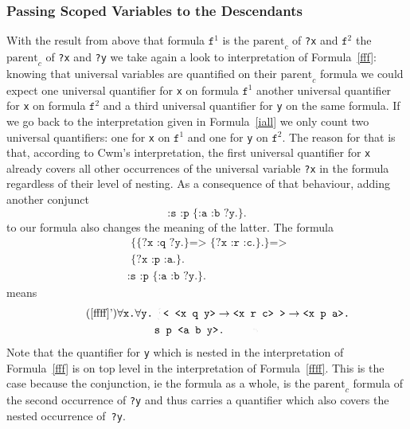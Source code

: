 \subsubsection*{Passing Scoped Variables to the Descendants}
With the result from above that formula $\texttt{f}^1$ is the $\text{parent}_c$ of \texttt{?x} and $\texttt{f}^2$ the $\text{parent}_c$ of \texttt{?x} and \texttt{?y} we take again a look to 
interpretation %
of Formula~\ref{fff}: 
knowing that universal variables are quantified on their $\text{parent}_c$ formula we could expect one universal quantifier for \texttt{x} on formula $\texttt{f}^1$ 
another universal quantifier for \texttt{x} on formula
$\texttt{f}^2$ and a third universal quantifier for \texttt{y} on the same formula. If we go back to the interpretation given in Formula~\ref{iall} we 
only count two universal quantifiers: one for \texttt{x} on $\texttt{f}^1$ and one for \texttt{y} on $\texttt{f}^2$. The reason for that is that, 
according to Cwm's interpretation,
the first universal quantifier for \texttt{x} already covers all other occurrences of the universal variable \texttt{?x} in the formula regardless of their level of nesting. 
As a consequence of that behaviour, adding another conjunct 
\[
 \texttt{:s :p \{:a :b ?y.\}.}
\]
to our formula also changes the meaning of the latter. The formula
\begin{multline}\label{ffff}
\texttt{ \{\{?x :q ?y.\} => \{?x :r :c.\}.\}=>}\\
\texttt{                    \{?x :p :a.\}.}\\
 \texttt{:s :p \{:a :b ?y.\}.}
\end{multline}
means
 \begin{multline}\tag{\ref{ffff}'} \label{ffff'}
   \forall \texttt{x.}\forall \texttt{y.}\lhexbrace
  \texttt{< <x q y>} \rightarrow \texttt{<x r c> >}\rightarrow  \texttt{<x p a>.}\\
  \texttt{s p <a b y>.\rhexbrace
  }
 \end{multline}
Note that the quantifier for \texttt{y} which is nested in the interpretation of Formula~\ref{fff} is on top level in the interpretation of Formula~\ref{ffff}. 
This is the case because the conjunction, ie the formula as a whole, is the $\text{parent}_c$ formula of the second occurrence of \texttt{?y} and thus carries a quantifier which 
also covers the nested occurrence of~\texttt{?y}.

